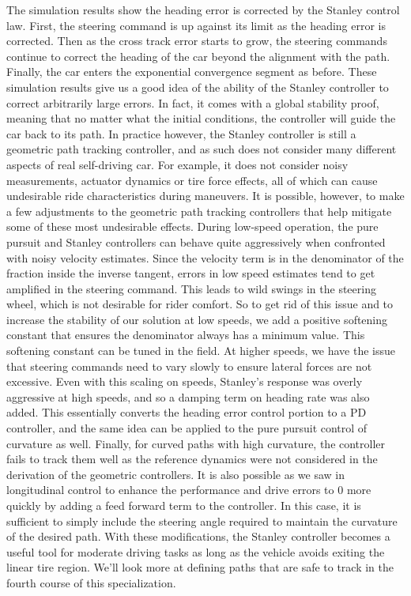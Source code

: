 The simulation results show the heading error is corrected by the Stanley control law. First, the steering command is up against its limit as the heading error is corrected. 
Then as the cross track error starts to grow, the steering commands continue to correct the heading of the car beyond the alignment with the path. Finally, the car enters the exponential convergence segment as before. These simulation results give us a good idea of the ability of the Stanley controller to correct arbitrarily large errors. 
In fact, it comes with a global stability proof, meaning that no matter what the initial conditions, the controller will guide the car back to its path. 
In practice however, the Stanley controller is still a geometric path tracking controller, and as such does not consider many different aspects of real self-driving car. 
For example, it does not consider noisy measurements, actuator dynamics or tire force effects, all of which can cause undesirable ride characteristics during maneuvers. 
It is possible, however, to make a few adjustments to the geometric path tracking controllers that help mitigate some of these most undesirable effects. During low-speed operation, the pure pursuit and Stanley controllers can behave quite aggressively when confronted with noisy velocity estimates. Since the velocity term is in the denominator of the fraction inside the inverse tangent, errors in low speed estimates tend to get amplified in the steering command. This leads to wild swings in the steering wheel, which is not desirable for rider comfort. So to get rid of this issue and to increase the stability of our solution at low speeds, we add a positive softening constant that ensures the denominator always has a minimum value. This softening constant can be tuned in the field. At higher speeds, we have the issue that steering commands need to vary slowly to ensure lateral forces are not excessive. Even with this scaling on speeds, Stanley's response was overly aggressive at high speeds, and so a damping term on heading rate was also added. This essentially converts the heading error control portion to a PD controller, and the same idea can be applied to the pure pursuit control of curvature as well. Finally, for curved paths with high curvature, the controller fails to track them well as the reference dynamics were not considered in the derivation of the geometric controllers. It is also possible as we saw in longitudinal control to enhance the performance and drive errors to 0 more quickly by adding a feed forward term to the controller. In this case, it is sufficient to simply include the steering angle required to maintain the curvature of the desired path. With these modifications, the Stanley controller becomes a useful tool for moderate driving tasks as long as the vehicle avoids exiting the linear tire region. We'll look more at defining paths that are safe to track in the fourth course of this specialization. 

